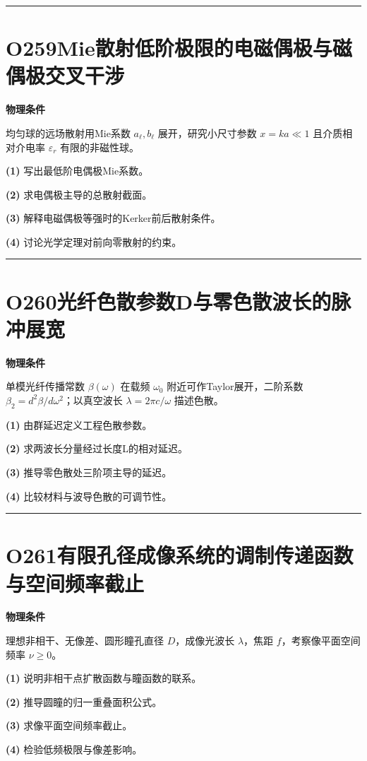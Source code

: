 \documentclass[UTF8,a4paper,11pt,oneside,openany]{ctexbook}
\begin{document}
\par\bigskip\hrule\bigskip
\section*{O259\quad Mie散射低阶极限的电磁偶极与磁偶极交叉干涉}
\textbf{物理条件}\par 均匀球的远场散射用Mie系数 \(a_\ell,b_\ell\) 展开，研究小尺寸参数 \(x=ka\ll1\) 且介质相对介电率 \(\varepsilon_r\) 有限的非磁性球。
\par\noindent\textbf{(1)} 写出最低阶电偶极Mie系数。
\par\noindent\textbf{(2)} 求电偶极主导的总散射截面。
\par\noindent\textbf{(3)} 解释电磁偶极等强时的Kerker前后散射条件。
\par\noindent\textbf{(4)} 讨论光学定理对前向零散射的约束。

\par\bigskip\hrule\bigskip
\section*{O260\quad 光纤色散参数D与零色散波长的脉冲展宽}
\textbf{物理条件}\par 单模光纤传播常数 \(\beta(\omega)\) 在载频 \(\omega_0\) 附近可作Taylor展开，二阶系数 \(\beta_2=d^2\beta/d\omega^2\)；以真空波长 \(\lambda=2\pi c/\omega\) 描述色散。
\par\noindent\textbf{(1)} 由群延迟定义工程色散参数。
\par\noindent\textbf{(2)} 求两波长分量经过长度L的相对延迟。
\par\noindent\textbf{(3)} 推导零色散处三阶项主导的延迟。
\par\noindent\textbf{(4)} 比较材料与波导色散的可调节性。

\par\bigskip\hrule\bigskip
\section*{O261\quad 有限孔径成像系统的调制传递函数与空间频率截止}
\textbf{物理条件}\par 理想非相干、无像差、圆形瞳孔直径 \(D\)，成像光波长 \(\lambda\)，焦距 \(f\)，考察像平面空间频率 \(\nu\ge0\)。
\par\noindent\textbf{(1)} 说明非相干点扩散函数与瞳函数的联系。
\par\noindent\textbf{(2)} 推导圆瞳的归一重叠面积公式。
\par\noindent\textbf{(3)} 求像平面空间频率截止。
\par\noindent\textbf{(4)} 检验低频极限与像差影响。
\end{document}
